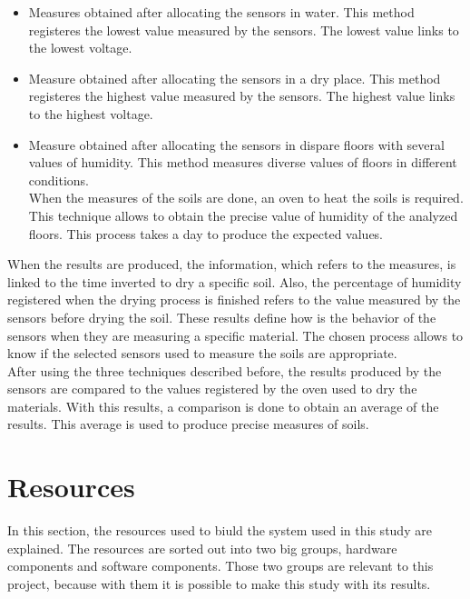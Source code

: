 \begin{itemize}

\item Measures obtained after allocating the sensors in water. This method registeres the lowest value measured by the sensors. The lowest value links to the lowest voltage.

\item Measure obtained after allocating the sensors in a dry place. This method registeres the highest value measured by the sensors. The highest value links to the highest voltage.

\item Measure obtained after allocating the sensors in dispare floors with several values of humidity. This method measures diverse values of floors in different conditions.\\

When the measures of the soils are done, an oven to heat the soils is required. This technique allows to obtain the precise value of humidity of the analyzed floors. This process takes a day to produce the expected values.

\end{itemize}

When the results are produced, the information, which refers to the measures, is linked to the time inverted to dry a specific soil. Also, the percentage of humidity registered when the drying process is finished refers to the value measured by the sensors before drying the soil. These results define how is the behavior of the sensors when they are measuring a specific material. The chosen process allows to know if the selected sensors used to measure the soils are appropriate.\\

After using the three techniques described before, the results produced by the sensors are compared to the values registered by the oven used to dry the materials. With this results, a comparison is done to obtain an average of the results. This average is used to produce precise measures of soils.

\section{Resources}

In this section, the resources used to biuld the system used in this study are explained. The resources are sorted out into two big groups, hardware components and software components. Those two groups are relevant to this project, because with them it is possible to make this study with its results.

